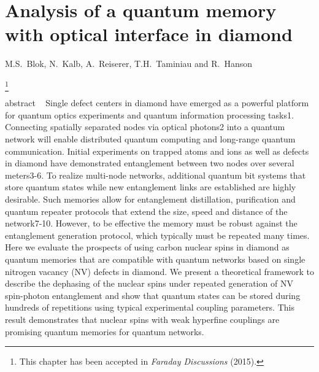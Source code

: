 \graphicspath{{./ch_C13_dephasing_LDE/figures/}}


\chapter{Analysis of a quantum memory with optical interface in diamond }
\label{ch:CDL}

\begin{center} 
    \vspace{-1cm} {M.S.~Blok, N.~Kalb, A.~Reiserer, T.H.~Taminiau and R.~Hanson} 
\end{center}


{\renewcommand{\thefootnote}{}\footnote{This chapter has been accepted in
    {\em Faraday Discussions} (2015).}}


\vspace{-0.5cm} 
abstract ~\cite{Gao_NatPhoton_2015,Kimble_Nature_2008,Moehring_Nature_2007,Ritter_Nature_2012,Hofmann_Science_2012,Bernien_Nature_2013,Bennett_Phys.Rev.Lett._1996,Campbell_Phys.Rev.Lett._2008,Briegel_Phys.Rev.Lett._1998,Childress_Phys.Rev.Lett._2006,Childress__2013,Togan_Nature_2010,Bernien_Nature_2013,Pfaff_Science_2014,Jelezko_Phys.Rev.Lett._2004,Dutt_Science_2007,Neumann_Science_2008a,Smeltzer_Phys.Rev.A_2009,Fuchs_NatPhys_2011,vanderSar_Nature_2012,Taminiau_Phys.Rev.Lett._2012,Maurer_Science_2012,Tamarat_NewJ.Phys._2008,Robledo_Nature_2011,Togan_Nature_2010,Kolkowitz_Phys.Rev.Lett._2012,Zhao_NatNano_2012,Taminiau_NatNano_2014,Barrett_Phys.Rev.A_2005}
Single defect centers in diamond have emerged as a powerful platform for quantum optics experiments and quantum information processing tasks1. Connecting spatially separated nodes via optical photons2 into a quantum network will enable distributed quantum computing and long-range quantum communication. Initial experiments on trapped atoms and ions as well as defects in diamond have demonstrated entanglement between two nodes over several meters3-6. To realize multi-node networks, additional quantum bit systems that store quantum states while new entanglement links are established are highly desirable. Such memories allow for entanglement distillation, purification and quantum repeater protocols that extend the size, speed and distance of the network7-10. However, to be effective the memory must be robust against the entanglement generation protocol, which typically must be repeated many times. Here we evaluate the prospects of using carbon nuclear spins in diamond as quantum memories that are compatible with quantum networks based on single nitrogen vacancy (NV) defects in diamond. We present a theoretical framework to describe the dephasing of the nuclear spins under repeated generation of NV spin-photon entanglement and show that quantum states can be stored during hundreds of repetitions using typical experimental coupling parameters. This result demonstrates that nuclear spins with weak hyperfine couplings are promising quantum memories for quantum networks.
\clearpage

